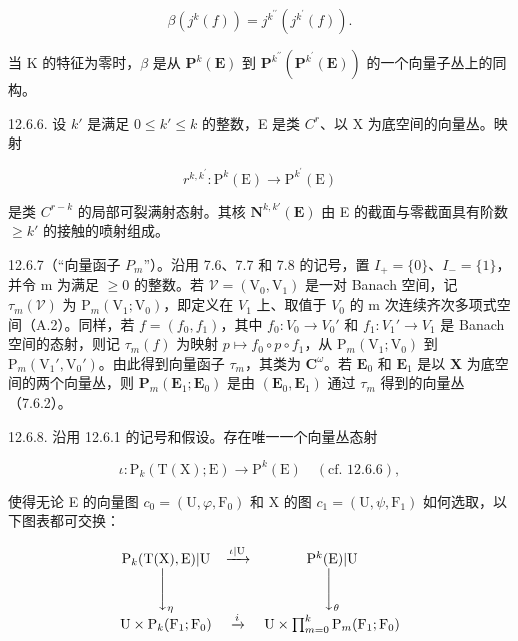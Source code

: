 \[
\beta (j ^ {k} (f)) = j ^ {k ^ {\prime \prime}} (j ^ {k ^ {\prime}} (f)).
\]

当 K 的特征为零时，\(\beta\) 是从 \(\mathbf{P}^{k}(\mathbf{E})\) 到 \(\mathbf{P}^{k^{\prime\prime}}(\mathbf{P}^{k^{\prime}}(\mathbf{E}))\) 的一个向量子丛上的同构。

12.6.6. 设 \(k'\) 是满足 \(0 \leqslant k' \leqslant k\) 的整数，E 是类 \(C^r\)、以 X 为底空间的向量丛。映射

\[
r ^ {k, k ^ {\prime}}: \mathrm{P} ^ {k} (\mathrm{E}) \rightarrow \mathrm{P} ^ {k ^ {\prime}} (\mathrm{E})
\]

是类 \(C^{r-k}\) 的局部可裂满射态射。其核 \(\mathbf{N}^{k,k'}(\mathbf{E})\) 由 E 的截面与零截面具有阶数 \(\geqslant k'\) 的接触的喷射组成。

12.6.7（“向量函子 \(P_{m}\)”）。沿用 7.6、7.7 和 7.8 的记号，置 \(I_{+} = \{0\}\)、\(I_{-} = \{1\}\)，并令 m 为满足 \(\geqslant 0\) 的整数。若 \(\mathcal{V} = (\mathrm{V}_{0}, \mathrm{V}_{1})\) 是一对 Banach 空间，记 \(\tau_{m}(\mathcal{V})\) 为 \(\mathrm{P}_{m}(\mathrm{V}_{1}; \mathrm{V}_{0})\)，即定义在 \(V_{1}\) 上、取值于 \(V_{0}\) 的 m 次连续齐次多项式空间（A.2）。同样，若 \(f = (f_{0}, f_{1})\)，其中 \(f_{0}: V_{0} \to V_{0}'\) 和 \(f_{1}: V_{1}' \to V_{1}\) 是 Banach 空间的态射，则记 \(\tau_{m}(f)\) 为映射 \(p \mapsto f_{0} \circ p \circ f_{1}\)，从 \(\mathrm{P}_{m}(\mathrm{V}_{1}; \mathrm{V}_{0})\) 到 \(\mathrm{P}_{m}(\mathrm{V}_{1}', \mathrm{V}_{0}')\)。由此得到向量函子 \(\tau_{m}\)，其类为 \(\mathbf{C}^{\omega}\)。若 \(\mathbf{E}_{0}\) 和 \(\mathbf{E}_{1}\) 是以 \(\mathbf{X}\) 为底空间的两个向量丛，则 \(\mathbf{P}_{m}(\mathbf{E}_{1};\mathbf{E}_{0})\) 是由 \((\mathbf{E}_{0},\mathbf{E}_{1})\) 通过 \(\tau_{m}\) 得到的向量丛（7.6.2）。

12.6.8. 沿用 12.6.1 的记号和假设。存在唯一一个向量丛态射

\[
\iota\colon\mathrm{P}_{k}(\mathrm{T}(\mathrm{X});\mathrm{E})\rightarrow\mathrm{P}^{k}(\mathrm{E})\quad(\text{cf. 12.6.6}),
\]

使得无论 E 的向量图 \(c_{0} = (\mathrm{U}, \varphi, \mathrm{F}_{0})\) 和 X 的图 \(c_{1} = (\mathrm{U}, \psi, \mathrm{F}_{1})\) 如何选取，以下图表都可交换：

\[
\begin{array}{c c c} \mathrm{P} _ {k} (\mathrm{T} (\mathrm{X}), \mathrm{E}) | \mathrm{U} & \xrightarrow {\iota | \mathrm{U}} & \mathrm{P} ^ {k} (\mathrm{E}) | \mathrm{U} \\ \Biggl \downarrow_ {\eta} & & \Biggl \downarrow_ {\theta} \\ \mathrm{U} \times \mathrm{P} _ {k} (\mathrm{F} _ {1}; \mathrm{F} _ {0}) & \xrightarrow {i} & \mathrm{U} \times \prod_ {m = 0} ^ {k} \mathrm{P} _ {m} (\mathrm{F} _ {1}; \mathrm{F} _ {0}) \end{array}
\]

